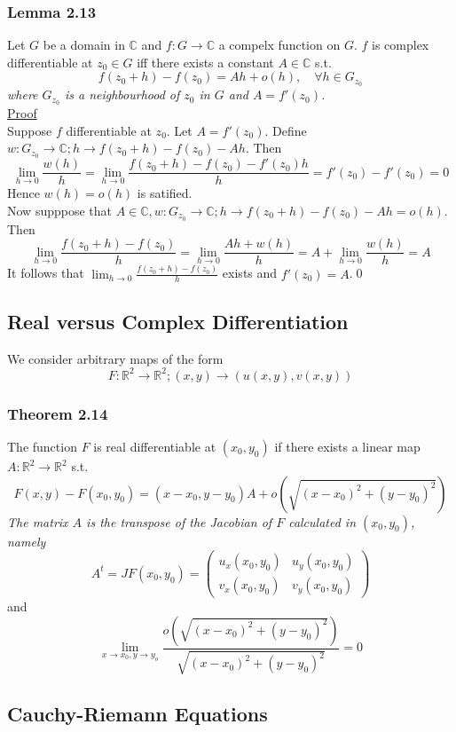 \documentclass[a4paper, 12pt, twoside]{article}
\begin{document}
\subsubsection*{Lemma 2.13}
Let $G$ be a domain in $\mathbb{C}$ and $f:G \to  \mathbb{C}$ a compelx function on $G$. $f$ is complex differentiable at $z_{0}\in G$ iff there exists a constant $A\in \mathbb{C}$ s.t.
$$ f(z_{0}+h)-f(z_{0})=Ah+o(h),\quad \forall h\in G_{z_{0}}$$
\textit{where $G_{z_{0}}$ is a neighbourhood of $z_{0}$ in $G$ and $A=f'(z_{0})$.}\\
\underline{Proof}\\
Suppose $f$ differentiable at $z_{0}$. Let $A=f'(z_{0})$. Define $w:G_{z_{0}} \to  \mathbb{C};h\to f(z_{0}+h)-f(z_{0})-Ah$. Then
$$\lim_{h\to0}\frac{w(h)}{h}=\lim_{h\to0}\frac{f(z_{0}+h)-f(z_{0})-f'(z_{0})h}{h}=f'(z_{0})-f'(z_{0})=0$$
Hence $w(h)=o(h)$ is satified.\\
Now supppose that $A\in \mathbb{C}, w:G_{z_{0}} \to  \mathbb{C};h\to f(z_{0}+h)-f(z_{0})-Ah=o(h)$. Then
$$ \lim_{h\to0}\frac{f(z_{0}+h)-f(z_{0})}{h}=\lim_{h\to0}\frac{Ah+w(h)}{h}= A+\lim_{h\to0}\frac{w(h)}{h}=A$$
It follows that $\lim_{h\to0}\frac{f(z_{0}+h)-f(z_{0})}{h}$ exists and $f'(z_{0})=A$.\qed

\newpage
\subsection{Real versus Complex Differentiation}
We consider arbitrary maps of the form
$$F:\mathbb{R}^{2}\to \mathbb{R}^{2};(x,y)\to(u(x,y),v(x,y)) $$
\subsubsection*{Theorem 2.14}
The function $F$ is real differentiable at $(x_{0},y_{0})$ if there exists a linear map $A:\mathbb{R}^{2} \to  \mathbb{R}^{2}$ s.t.
$$F(x,y)-F(x_{0},y_{0})=(x-x_{0},y-y_{0})A+o(\sqrt{(x-x_{0})^{2}+(y-y_{0})^{2}})$$
\textit{The matrix $A$ is the transpose of the Jacobian of $F$ calculated in $(x_{0},y_{0})$, namely}
$$A^{t}=JF(x_{0},y_{0})=
\begin{pmatrix}
        u_{x}(x_{0},y_{0}) & u_{y}(x_{0},y_{0})\\
        v_{x}(x_{0},y_{0}) & v_{y}(x_{0},y_{0})
\end{pmatrix}$$
and
$$\lim_{x\to x_{0},y\to y_{o}}\frac{o(\sqrt{(x-x_{0})^{2}+(y-y_{0})^{2}})}{\sqrt{(x-x_{0})^{2}+(y-y_{0})^{2}}}=0 $$

\newpage
\subsection{Cauchy-Riemann Equations}
\end{document}
